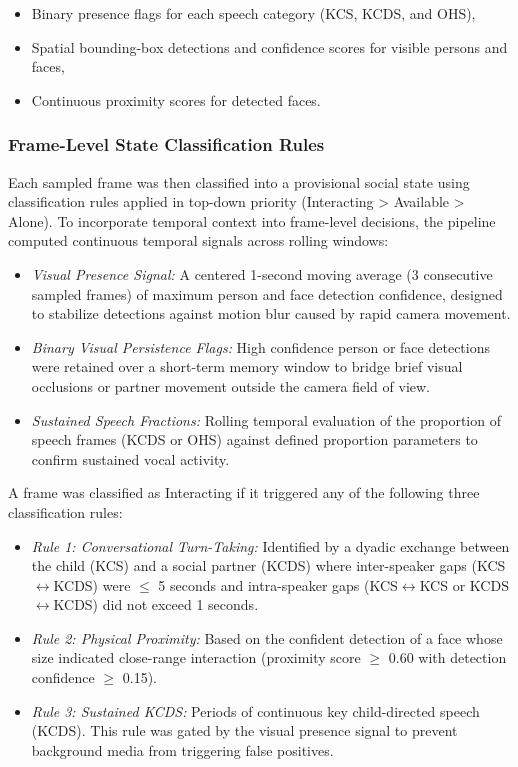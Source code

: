 \documentclass[
  english,
  12pt,
  man,floatsintext]{apa6}
\providecommand{\tightlist}{%
  \setlength{\itemsep}{0pt}\setlength{\parskip}{0pt}}
\begin{document}
\begin{itemize}
\tightlist
\item
  Binary presence flags for each speech category (KCS, KCDS, and OHS),
\item
  Spatial bounding-box detections and confidence scores for visible persons and faces,
\item
  Continuous proximity scores for detected faces.
\end{itemize}

\subsubsection{Frame-Level State Classification Rules}\label{frame-level-classification}

Each sampled frame was then classified into a provisional social state using classification rules applied in top-down priority (Interacting \textgreater{} Available \textgreater{} Alone). To incorporate temporal context into frame-level decisions, the pipeline computed continuous temporal signals across rolling windows:

\begin{itemize}
\tightlist
\item
  \emph{Visual Presence Signal:} A centered 1-second moving average (3 consecutive sampled frames) of maximum person and face detection confidence, designed to stabilize detections against motion blur caused by rapid camera movement.
\item
  \emph{Binary Visual Persistence Flags:} High confidence person or face detections were retained over a short-term memory window to bridge brief visual occlusions or partner movement outside the camera field of view.
\item
  \emph{Sustained Speech Fractions:} Rolling temporal evaluation of the proportion of speech frames (KCDS or OHS) against defined proportion parameters to confirm sustained vocal activity.
\end{itemize}

A frame was classified as Interacting if it triggered any of the following three classification rules:

\begin{itemize}
\tightlist
\item
  \emph{Rule 1: Conversational Turn-Taking:} Identified by a dyadic exchange between the child (KCS) and a social partner (KCDS) where inter-speaker gaps (KCS\(\leftrightarrow\)KCDS) were \(\le\) 5 seconds and intra-speaker gaps (KCS\(\leftrightarrow\)KCS or KCDS\(\leftrightarrow\)KCDS) did not exceed 1 seconds.
\item
  \emph{Rule 2: Physical Proximity:} Based on the confident detection of a face whose size indicated close-range interaction (proximity score \(\ge\) 0.60 with detection confidence \(\ge\) 0.15).
\item
  \emph{Rule 3: Sustained KCDS:} Periods of continuous key child-directed speech (KCDS). This rule was gated by the visual presence signal to prevent background media from triggering false positives.
\end{itemize}
\end{document}
